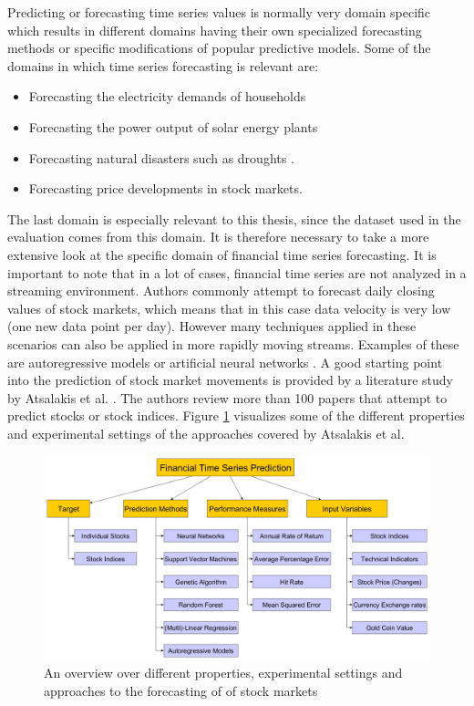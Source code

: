 Predicting or forecasting time series values is normally very domain specific which results in different domains having their own specialized forecasting methods or specific modifications of popular predictive models. Some of the domains in which time series forecasting is relevant are:

\begin{itemize}
	\item Forecasting the electricity demands of households \cite{veit2014household}
	\item Forecasting the power output of solar energy plants \cite{inman2013solar}
	\item Forecasting natural disasters such as droughts \cite{mishra2006drought}.
	\item Forecasting price developments in stock markets.
\end{itemize}

The last domain is especially relevant to this thesis, since the dataset used in the evaluation comes from this domain. It is therefore necessary to take a more extensive look at the specific domain of financial time series forecasting. It is important to note that in a lot of cases, financial time series are not analyzed in a streaming environment. Authors commonly attempt to forecast daily closing values of stock markets, which means that in this case data velocity is very low (one new data point per day). However many techniques applied in these scenarios can also be applied in more rapidly moving streams. Examples of these are autoregressive models \cite{terasvirta1994specification} or artificial neural networks \cite{gama2010knowledge}. \newline
A good starting point into the prediction of stock market movements is provided by a literature study by Atsalakis et al. \cite{atsalakis2009surveying}. The authors review more than 100 papers that attempt to predict stocks or stock indices. Figure \ref{fig_financialTimeSeriesPredictionOverview} visualizes some of the different properties and experimental settings of the approaches covered by Atsalakis et al.

\begin{figure}[h]
	\centering
  	\includegraphics[width=\textwidth]{financialTimeSeriesPredictionOverview}
	\caption{An overview over different properties, experimental settings and approaches to the forecasting of of stock markets}
	\label{fig_financialTimeSeriesPredictionOverview}
\end{figure}


